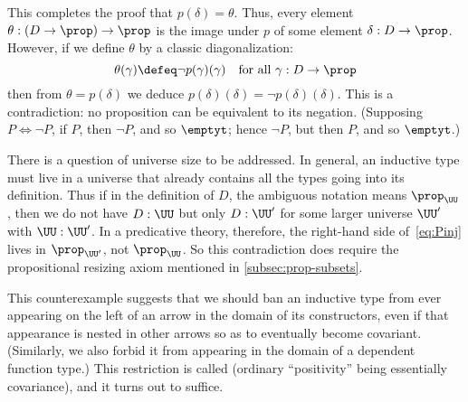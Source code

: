 This completes the proof that $p(\delta)=\theta$.
Thus, every element $\theta:(D\to\prop)\to\prop$ is the image under $p$ of some element $\delta:D\to\prop$.
However, if we define $\theta$ by a classic diagonalization:
\[ \theta(\gamma) \defeq \neg p(\gamma)(\gamma) \quad\text{for all $\gamma:D\to\prop$} \]
then from $\theta = p(\delta)$ we deduce $p(\delta)(\delta) = \neg p(\delta)(\delta)$.
This is a contradiction: no proposition can be equivalent to its negation.
(Supposing $P\Leftrightarrow \neg P$, if $P$, then $\neg P$, and so $\emptyt$; hence $\neg P$, but then $P$, and so $\emptyt$.)

\begin{rmk}
  There is a question of universe size to be addressed.
  In general, an inductive type must live in a universe that already contains all the types going into its definition.
  Thus if in the definition of $D$, the ambiguous notation \prop means $\prop_{\UU}$, then we do not have $D:\UU$ but only $D:\UU'$ for some larger universe $\UU'$ with $\UU:\UU'$.
  In a predicative theory, therefore, the right-hand side of~\eqref{eq:Pinj} lives in $\prop_{\UU'}$, not $\prop_\UU$.
  So this contradiction does require the propositional resizing axiom
  mentioned in \autoref{subsec:prop-subsets}.
\end{rmk}

%
This counterexample suggests that we should ban an inductive type from ever appearing on the left of an arrow in the domain of its constructors, even if that appearance is nested in other arrows so as to eventually become covariant.
(Similarly, we also forbid it from appearing in the domain of a dependent function type.)
This restriction is called 
%
%
(ordinary ``positivity'' being essentially covariance), and it turns out to suffice.

